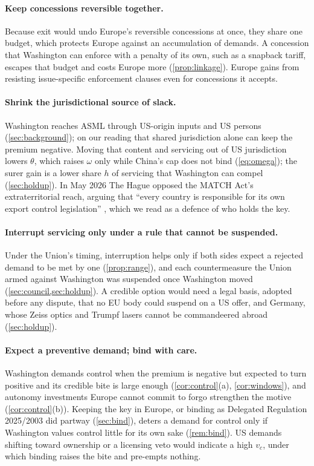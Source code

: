 \paragraph{Keep concessions reversible together.} Because exit would undo Europe's reversible concessions at once, they share one budget, which protects Europe against an accumulation of demands. A concession that Washington can enforce with a penalty of its own, such as a snapback tariff, escapes that budget and costs Europe more (\cref{prop:linkage}). Europe gains from resisting issue-specific enforcement clauses even for concessions it accepts.

\paragraph{Shrink the jurisdictional source of slack.} Washington reaches ASML through US-origin inputs and US persons (\cref{sec:background}); on our reading that shared jurisdiction alone can keep the premium negative. Moving that content and servicing out of US jurisdiction lowers $\theta$, which raises $\omega$ only while China's cap does not bind (\cref{eq:omega}); the surer gain is a lower share $h$ of servicing that Washington can compel (\cref{sec:holdup}). In May 2026 The Hague opposed the MATCH Act's extraterritorial reach, arguing that ``every country is responsible for its own export control legislation'' \citep[our translation]{tk2026match}, which we read as a defence of who holds the key.

\paragraph{Interrupt servicing only under a rule that cannot be suspended.} Under the Union's timing, interruption helps only if both sides expect a rejected demand to be met by one (\cref{prop:range}), and each countermeasure the Union armed against Washington was suspended once Washington moved (\cref{sec:council,sec:holdup}). A credible option would need a legal basis, adopted before any dispute, that no EU body could suspend on a US offer, and Germany, whose Zeiss optics and Trumpf lasers cannot be commandeered abroad (\cref{sec:holdup}).

\paragraph{Expect a preventive demand; bind with care.} Washington demands control when the premium is negative but expected to turn positive and its credible bite is large enough (\cref{cor:control}(a), \cref{cor:windows}), and autonomy investments Europe cannot commit to forgo strengthen the motive (\cref{cor:control}(b)). Keeping the key in Europe, or binding as Delegated Regulation 2025/2003 \citep{eu2025dualuse} did partway (\cref{sec:bind}), deters a demand for control only if Washington values control little for its own sake (\cref{rem:bind}). US demands shifting toward ownership or a licensing veto would indicate a high $v_c$, under which binding raises the bite and pre-empts nothing.

